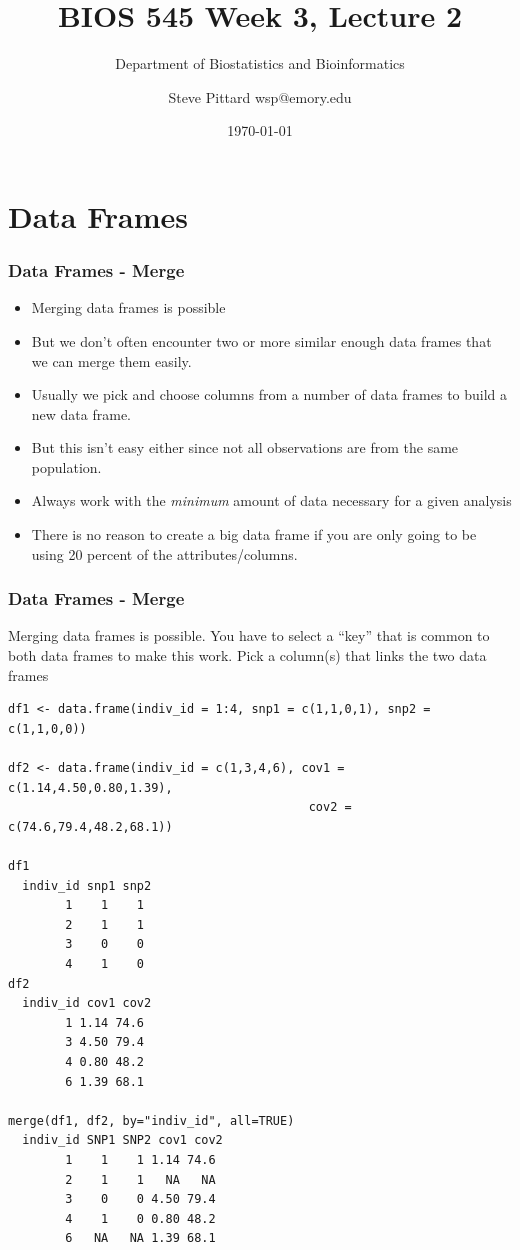 \documentclass{beamer}
\begin{document}


\title{BIOS 545 Week 3, Lecture 2}
\author{Steve Pittard wsp@emory.edu}
\subtitle{Department of Biostatistics and Bioinformatics}
\date{\today}

\maketitle


\section{Data Frames}


\begin{frame}[fragile]
\frametitle{Data Frames - Merge}
\begin{itemize}

\item Merging data frames is possible  

\item But we don't often encounter two or more similar
enough data frames that we can merge them easily. 

\item Usually we pick and choose columns from a number of data frames to build a new data frame. 

\item But this isn't easy either since not all observations are from the same population.

\item Always work with the \emph{minimum} amount of data necessary for a given analysis 

\item There is no reason to create a big data frame if you are only going to be using 20 percent of 
the attributes/columns.
\end{itemize}
\end{frame}



\begin{frame}[fragile]
\frametitle{Data Frames - Merge}
Merging data frames is possible. You have to select a ``key'' that is common to both data frames to make this work. Pick a column(s) that links the two data frames
\footnotesize
\begin{verbatim}
df1 <- data.frame(indiv_id = 1:4, snp1 = c(1,1,0,1), snp2 = c(1,1,0,0)) 

df2 <- data.frame(indiv_id = c(1,3,4,6), cov1 = c(1.14,4.50,0.80,1.39), 
                                          cov2 = c(74.6,79.4,48.2,68.1))

df1
  indiv_id snp1 snp2
        1    1    1
        2    1    1
        3    0    0
        4    1    0
df2
  indiv_id cov1 cov2
        1 1.14 74.6
        3 4.50 79.4
        4 0.80 48.2
        6 1.39 68.1

merge(df1, df2, by="indiv_id", all=TRUE)
  indiv_id SNP1 SNP2 cov1 cov2
        1    1    1 1.14 74.6
        2    1    1   NA   NA
        3    0    0 4.50 79.4
        4    1    0 0.80 48.2
        6   NA   NA 1.39 68.1
\end{verbatim}
\end{frame}
\end{document}
